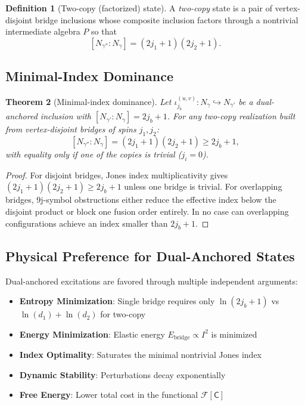 \documentclass[11pt]{article}
\newcommand{\Index}[2]{\left[#1:#2\right]}
\theoremstyle{plain}
\newtheorem{theorem}{Theorem}[section]
\theoremstyle{definition}
\newtheorem{definition}[theorem]{Definition}
\begin{document}
\begin{definition}[Two-copy (factorized) state]\label{def:two-copy}
  A \emph{two-copy} state is a pair of vertex-disjoint bridge inclusions whose composite inclusion factors through a nontrivial intermediate algebra $P$ so that
  \[
    \Index{N_{\gamma''}}{N_\gamma} = (2j_1+1)(2j_2+1).
  \]
\end{definition}

\subsection{Minimal-Index Dominance}

\begin{theorem}[Minimal-index dominance]\label{thm:min-index-dominance}
  Let $\iota^{(u,v)}_{j_b}:N_\gamma\hookrightarrow N_{\gamma'}$ be a dual-anchored inclusion with $\Index{N_{\gamma'}}{N_\gamma}=2j_b+1$.
  For any two-copy realization built from vertex-disjoint bridges of spins $j_1,j_2$:
  \[
    \Index{N_{\gamma''}}{N_\gamma} = (2j_1+1)(2j_2+1) \geq 2j_b+1,
  \]
  with equality only if one of the copies is trivial ($j_i=0$).
\end{theorem}

\begin{proof}
  For disjoint bridges, Jones index multiplicativity gives $(2j_1+1)(2j_2+1) \geq 2j_b+1$ unless one bridge is trivial. For overlapping bridges, 9j-symbol obstructions either reduce the effective index below the disjoint product or block one fusion order entirely. In no case can overlapping configurations achieve an index smaller than $2j_b+1$.
\end{proof}

\subsection{Physical Preference for Dual-Anchored States}

\begin{tcolorbox}[title=Why Dual-Anchored Excitations are Physically Preferred]
  Dual-anchored excitations are favored through multiple independent arguments:
  \begin{itemize}
    \item \textbf{Entropy Minimization}: Single bridge requires only $\ln(2j_b+1)$ vs $\ln(d_1) + \ln(d_2)$ for two-copy
    \item \textbf{Energy Minimization}: Elastic energy $E_{\text{bridge}} \propto I^2$ is minimized
    \item \textbf{Index Optimality}: Saturates the minimal nontrivial Jones index
    \item \textbf{Dynamic Stability}: Perturbations decay exponentially
    \item \textbf{Free Energy}: Lower total cost in the functional $\mathcal{F}[\mathsf{C}]$
  \end{itemize}
\end{tcolorbox}
\end{document}
